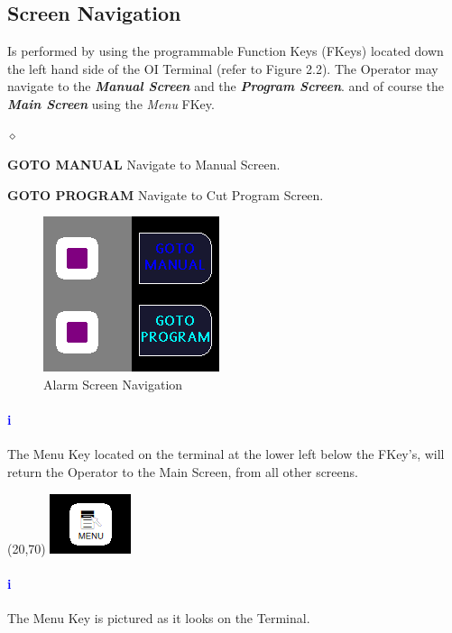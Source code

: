 \subsection{Screen Navigation}Is performed by using the programmable Function Keys (FKeys) located down the left hand side of the OI Terminal (refer to Figure 2.2). The Operator may navigate to the \textbf{\textit{Manual Screen}} and the \textbf{\textit{Program Screen}}. and of course the \textbf{\textit{Main Screen}} using the \textit{Menu} FKey.
\begin{list}{$\diamond$}{}
	\item \textbf{GOTO MANUAL} Navigate to Manual Screen.
	\item \textbf{GOTO PROGRAM} Navigate to Cut Program Screen.
\end{list}
\begin{figure}
	\centering
	\includegraphics[width=.3\linewidth]{screen-captures/alarms/alarms-nav}
	\caption{Alarm Screen Navigation}
	\label{fig:alarm-nav}
\end{figure}
\paragraph*{\textbf{\LARGE \textcolor{blue}{i}}}
The Menu Key located on the terminal at the lower left below the FKey's, will return the Operator to the Main Screen, from all other screens.\\
\begin{minipage}{4cm}
	\begin{picture}(20,70)
	\includegraphics[width=.5\linewidth]{screen-captures/menu}
	\end{picture}
\end{minipage}\begin{minipage}[]{11cm}
\paragraph{\textbf{\LARGE \textcolor{blue}{i}}} The Menu Key is pictured as it looks on the Terminal.
\end{minipage}
\pagebreak
